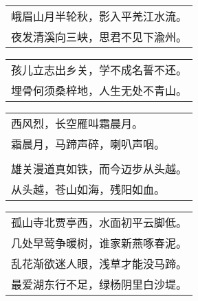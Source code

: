 \noindent\begin{minipage}{\linewidth}
  \vskip-3pt\begin{table}[H]
    \centering
    \begin{tabular}{@{}l@{}}
峨眉山月半轮秋，影入平羌江水流。\\
夜发清溪向三峡，思君不见下渝州。
    \end{tabular}
  \end{table}
\end{minipage}
\vspace{1cm}


\noindent\begin{minipage}{\linewidth}
  \vskip-3pt\begin{table}[H]
    \centering
    \begin{tabular}{@{}l@{}}
孩儿立志出乡关，学不成名誓不还。\\
埋骨何须桑梓地，人生无处不青山。
    \end{tabular}
  \end{table}
\end{minipage}
\vspace{1cm}


\noindent\begin{minipage}{\linewidth}
  \vskip-3pt\begin{table}[H]
    \centering
    \begin{tabular}{@{}l@{}}
西风烈，长空雁叫霜晨月。\\
霜晨月，马蹄声碎，喇叭声咽。\\
\\
雄关漫道真如铁，而今迈步从头越。\\
从头越，苍山如海，残阳如血。
    \end{tabular}
  \end{table}
\end{minipage}
\vspace{1cm}


\noindent\begin{minipage}{\linewidth}
  \vskip-3pt\begin{table}[H]
    \centering
    \begin{tabular}{@{}l@{}}
孤山寺北贾亭西，水面初平云脚低。\\
几处早莺争暖树，谁家新燕啄春泥。\\
乱花渐欲迷人眼，浅草才能没马蹄。\\
最爱湖东行不足，绿杨阴里白沙堤。
    \end{tabular}
  \end{table}
\end{minipage}
\vspace{1cm}


